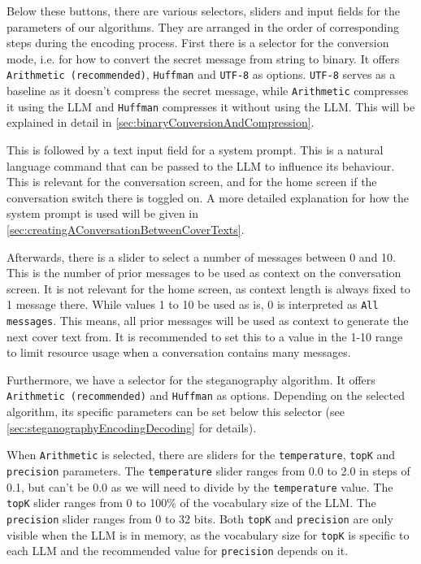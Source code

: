 Below these buttons, there are various selectors, sliders and input fields for the parameters of our algorithms. They are arranged in the order of corresponding steps during the encoding process. First there is a selector for the conversion mode, i.e. for how to convert the secret message from string to binary. It offers \lstinline|Arithmetic (recommended)|, \lstinline|Huffman| and \lstinline|UTF-8| as options. \lstinline|UTF-8| serves as a baseline as it doesn't compress the secret message, while \lstinline|Arithmetic| compresses it using the \gls{LLM} and \lstinline|Huffman| compresses it without using the \gls{LLM}. This will be explained in detail in \cref{sec:binaryConversionAndCompression}.

This is followed by a text input field for a system prompt. This is a natural language command that can be passed to the \gls{LLM} to influence its behaviour. This is relevant for the conversation screen, and for the home screen if the conversation switch there is toggled on. A more detailed explanation for how the system prompt is used will be given in \cref{sec:creatingAConversationBetweenCoverTexts}.

Afterwards, there is a slider to select a number of messages between 0 and 10. This is the number of prior messages to be used as context on the conversation screen. It is not relevant for the home screen, as context length is always fixed to 1 message there. While values 1 to 10 be used as is, 0 is interpreted as \lstinline|All messages|. This means, all prior messages will be used as context to generate the next cover text from. It is recommended to set this to a value in the 1-10 range to limit resource usage when a conversation contains many messages.

Furthermore, we have a selector for the steganography algorithm. It offers \lstinline|Arithmetic (recommended)| and \lstinline|Huffman| as options. Depending on the selected algorithm, its specific parameters can be set below this selector (see \cref{sec:steganographyEncodingDecoding} for details).

When \lstinline|Arithmetic| is selected, there are sliders for the \lstinline|temperature|, \lstinline|topK| and \lstinline|precision| parameters. The \lstinline|temperature| slider ranges from 0.0 to 2.0 in steps of 0.1, but can't be 0.0 as we will need to divide by the \lstinline|temperature| value. The \lstinline|topK| slider ranges from 0 to 100\% of the vocabulary size of the \gls{LLM}. The \lstinline|precision| slider ranges from 0 to 32 bits. Both \lstinline|topK| and \lstinline|precision| are only visible when the \gls{LLM} is in memory, as the vocabulary size for \lstinline|topK| is specific to each \gls{LLM} and the recommended value for \lstinline|precision| depends on it.

